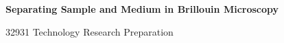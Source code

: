 \documentclass[11pt]{article}
\begin{document}
\hypersetup{pageanchor=false}
\begin{titlepage}
\centering\vspace*{3cm}
{\Huge\bfseries Separating Sample and Medium in Brillouin Microscopy\par}
\vspace{2cm}{\Large Noah Klugman\par}
\vspace{0.3cm}{\large Student ID: 24948806\par}
\vfill{\large 32931 Technology Research Preparation\par}
\vspace{0.3cm}{\large University of Technology Sydney\par}
\vspace{1cm}{\large \today\par}
\end{titlepage}
\hypersetup{pageanchor=true}
\end{document}
